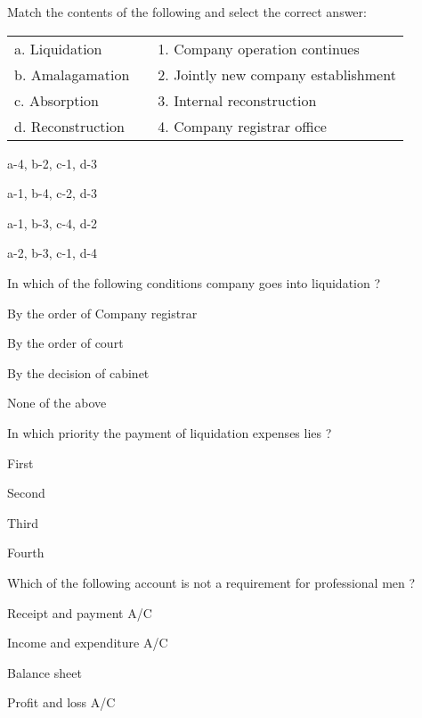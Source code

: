 \begin{questions}
\question Match the contents of the following and select the correct answer:
  \begin{table}[h]
  \centering
  \begin{tabular}{lll}
    a. Liquidation & & 1. Company operation continues \\[2mm]
    b. Amalagamation & & 2. Jointly new company establishment \\
    c. Absorption & & 3. Internal reconstruction \\
    d. Reconstruction & & 4. Company registrar office \\
  \end{tabular}
  \end{table}
  \begin{items}
  \item a-4, b-2, c-1, d-3
  \item a-1, b-4, c-2, d-3
  \item a-1, b-3, c-4, d-2
  \item a-2, b-3, c-1, d-4
  \end{items}

\question In which of the following conditions company goes into liquidation ?
  \begin{items}
  \item By the order of Company registrar
  \item By the order of court
  \item By the decision of cabinet
  \item None of the above
  \end{items}

\question In which priority the payment of liquidation expenses lies ?
  \begin{items}
  \item First
  \item Second
  \item Third
  \item Fourth
  \end{items}

\question Which of the following account is not a requirement for professional men ?
  \begin{items}
  \item Receipt and payment A/C
  \item Income and expenditure A/C
  \item Balance sheet
  \item Profit and loss A/C
  \end{items}


\end{questions}
